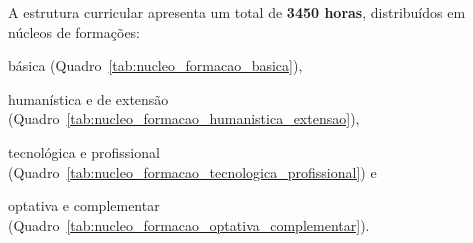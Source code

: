 A estrutura curricular apresenta um total de \textbf{3450 horas}, distribuídos em núcleos de formações: \begin{enumerate*}[label=\roman*.] \item básica (Quadro~\ref{tab:nucleo_formacao_basica}), \item humanística e de extensão (Quadro~\ref{tab:nucleo_formacao_humanistica_extensao}), \item tecnológica e profissional (Quadro~\ref{tab:nucleo_formacao_tecnologica_profissional}) e \item optativa e complementar (Quadro~\ref{tab:nucleo_formacao_optativa_complementar}). \end{enumerate*}
